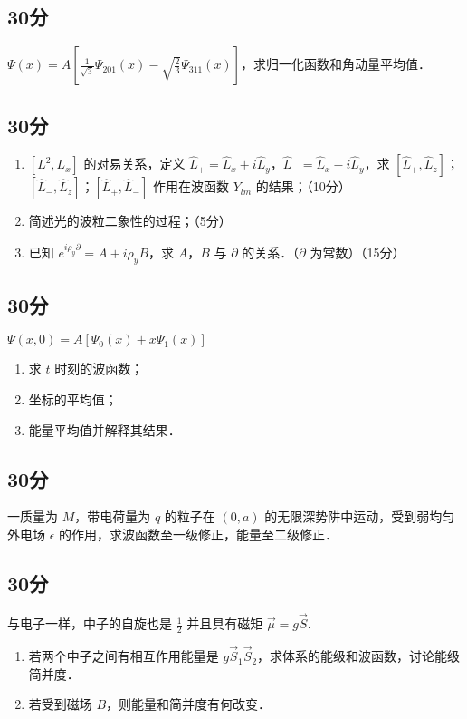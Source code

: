 
\subsection{30分}
$\displaystyle \varPsi (x)=A\left[\frac{1}{\sqrt{3}}\varPsi_{201}(x)-\sqrt{\frac{2}{3}}\varPsi_{311}(x)\right]$，求归一化函数和角动量平均值．
\subsection{30分}
\begin{enumerate}
\item $[L^{2},L_{x}]$ 的对易关系，定义 $\hat{L}_{+}=\hat{L}_{x}+i\hat{L}_{y}$，$\hat{L}_{-}=\hat{L}_{x}-i\hat{L}_{y}$，求 $[\hat{L}_{+},\hat{L}_{z}]$；$[\hat{L}_{-},\hat{L}_{z}]$；$[\hat{L}_{+},\hat{L}_{-}]$ 作用在波函数 $Y_{lm}$ 的结果；（10分）
\item 简述光的波粒二象性的过程；（5分）
\item 已知 $e^{i\rho_{y}\partial}=A+i\rho_{y}B$，求 $A$，$B$ 与 $\partial$ 的关系．（$\partial$ 为常数）（15分）
\end{enumerate}
\subsection{30分}
$\varPsi (x,0)=A[\varPsi_{0}(x)+x\varPsi_{1}(x)]$
\begin{enumerate}
\item 求 $t$ 时刻的波函数；
\item 坐标的平均值；
\item 能量平均值并解释其结果．
\end{enumerate}
\subsection{30分}
一质量为 $M$，带电荷量为 $q$ 的粒子在 $(0,a)$ 的无限深势阱中运动，受到弱均匀外电场 $\epsilon$ 的作用，求波函数至一级修正，能量至二级修正．
\subsection{30分}
与电子一样，中子的自旋也是 $\frac{1}{2}$ 并且具有磁矩 $\vec{\mu}=g\vec{S}$.
\begin{enumerate}
\item 若两个中子之间有相互作用能量是 $g\vec{S}_{1}\vec{S}_{2}$，求体系的能级和波函数，讨论能级简并度．
\item 若受到磁场 $B$，则能量和简并度有何改变．
\end{enumerate}